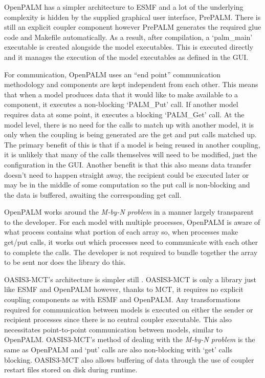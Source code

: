 OpenPALM has a simpler architecture to ESMF and a lot of the underlying
complexity is hidden by the supplied graphical user interface, PrePALM. There is
still an explicit coupler component however PrePALM generates the required glue
code and Makefile automatically. As a result, after compilation, a `palm\_main'
executable is created alongside the model executables. This is executed directly
and it manages the execution of the model executables as defined in the GUI.

For communication, OpenPALM uses an ``end point'' communication methodology
\cite{CERFACS2007} and components are kept independent from each other. This
means that when a model produces data that it would like to make available to a
component, it executes a non-blocking `PALM\_Put' call. If another model
requires data at some point, it executes a blocking `PALM\_Get' call. At the
model level, there is no need for the calls to match up with another model, it
is only when the coupling is being generated are the get and put calls matched
up. The primary benefit of this is that if a model is being reused in another
coupling, it is unlikely that many of the calls themselves will need to be
modified, just the configuration in the GUI. Another benefit is that this also
means data transfer doesn't need to happen straight away, the recipient could be
executed later or may be in the middle of some computation so the put call is
non-blocking and the data is buffered, awaiting the corresponding get call.

OpenPALM works around the \textit{M-by-N problem} in a manner largely
transparent to the developer. For each model with multiple processes, OpenPALM
is aware of what process contains what portion of each array so, when processes
make get/put calls, it works out which processes need to communicate with each
other to complete the calls. The developer is not required to bundle together
the array to be sent nor does the library do this.

OASIS3-MCT's architecture is simpler still \cite{OASIS3-MCT2013}. OASIS3-MCT is
only a library just like ESMF and OpenPALM however, thanks to MCT, it requires
no explicit coupling components as with ESMF and OpenPALM. Any transformations
required for communication between models is executed on either the sender or
recipient processes since there is no central coupler executable. This also
necessitates point-to-point communication between models, similar to OpenPALM.
OASIS3-MCT's method of dealing with the \textit{M-by-N problem} is the same as
OpenPALM and `put' calls are also non-blocking with `get' calls blocking.
OASIS3-MCT also allows buffering of data through the use of coupler restart
files stored on disk during runtime.

